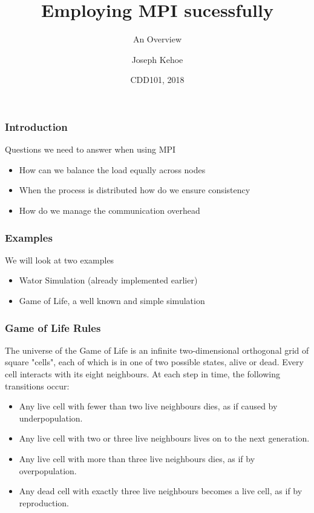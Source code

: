 \documentclass{beamer}
\title[MPI] %
{Employing MPI sucessfully}
\subtitle{An Overview}
\author[Dr. Joseph Kehoe] %
{Joseph Kehoe\inst{1}}
\institute[IT Carlow] %
{
	\inst{1}%
	Department of Computing and Networking\\
	Institute of Technology Carlow
}
\date[ITC 2018] %
{CDD101, 2018}
\begin{document}
 
\frame{\titlepage}
 
 

    \begin{frame}
    	\frametitle{Introduction}
    	Questions we need to answer when using MPI
    	\begin{itemize}
    		\item How can we balance the load equally across nodes
    		\item When the process is distributed how do we ensure consistency
    		\item How do we manage the communication overhead
    	\end{itemize}
    \end{frame}
    \begin{frame}
    	\frametitle{Examples}
    	We will look at two examples
    	\begin{itemize}
    		\item Wator Simulation (already implemented earlier)
    		\item Game of Life, a well known and simple simulation
    	\end{itemize}

    \end{frame}    
        \begin{frame}
        	\frametitle{Game of Life Rules}
        		The universe of the Game of Life is an infinite two-dimensional orthogonal grid of square "cells", each of which is in one of two possible states, alive or dead. Every cell interacts with its eight neighbours. At each step in time, the following transitions occur:
        	\begin{itemize}
        		\item Any live cell with fewer than two live neighbours dies, as if caused by underpopulation.
        		\item Any live cell with two or three live neighbours lives on to the next generation.
        		\item Any live cell with more than three live neighbours dies, as if by overpopulation.
        		\item Any dead cell with exactly three live neighbours becomes a live cell, as if by reproduction.
        	\end{itemize}
        \end{frame} 
\end{document}
